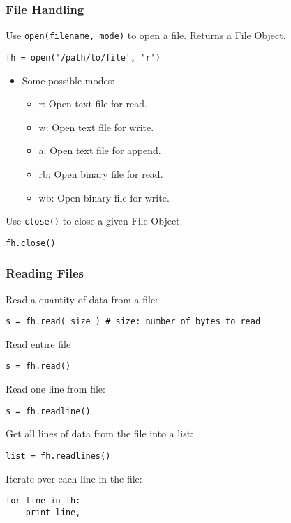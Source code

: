 \begin{frame}[fragile]
    \frametitle{File Handling}
    Use \verb#open(filename, mode)# to open a file. Returns a File Object.
    \begin{myColorBox}{0.9}{}
\begin{verbatim}
fh = open('/path/to/file', 'r')
\end{verbatim}
    \end{myColorBox}
   \begin{itemize}
   \item Some possible modes:
   \begin{itemize}
        \item r: Open text file for read.
        \item w: Open text file for write.
        \item a: Open text file for append.
        \item rb: Open binary file for read.
        \item wb: Open binary file for write.
    \end{itemize}
    \end{itemize}
    Use \verb#close()# to close a given File Object.
    \begin{myColorBox}{0.9}{}
\begin{verbatim}
fh.close()
\end{verbatim}
    \end{myColorBox}
\end{frame}

\begin{frame}[fragile]
    \frametitle{Reading Files}
Read a quantity of data from a file:
    \begin{myColorBox}{1.0}{}
\begin{verbatim}
s = fh.read( size ) # size: number of bytes to read
\end{verbatim}
    \end{myColorBox}
\pause
Read entire file
    \begin{myColorBox}{0.9}{}
\begin{verbatim}
s = fh.read()
\end{verbatim}
    \end{myColorBox}
\pause
Read one line from file:
    \begin{myColorBox}{0.9}{}
\begin{verbatim}
s = fh.readline()
\end{verbatim}
    \end{myColorBox}
\pause
Get all lines of data from the file into a list:
    \begin{myColorBox}{0.9}{}
\begin{verbatim}
list = fh.readlines()
\end{verbatim}
    \end{myColorBox}
\pause
Iterate over each line in the file:
    \begin{myColorBox}{0.9}{}
\begin{verbatim}
for line in fh:
    print line,
\end{verbatim}
    \end{myColorBox}
\end{frame}

